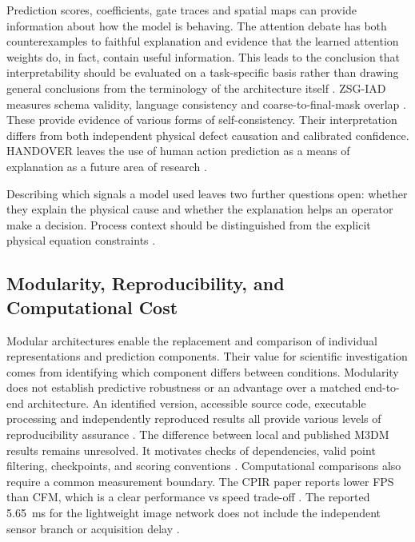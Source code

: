 Prediction scores, coefficients, gate traces and spatial maps can provide information about
how the model is behaving.
The attention debate has both counterexamples to faithful explanation and evidence that the learned
attention weights do, in fact, contain useful information. This leads to the conclusion that
interpretability should be evaluated on a task-specific basis rather than drawing general
conclusions from the terminology of the architecture itself \parencite{P036}.
ZSG-IAD measures schema validity, language consistency and coarse-to-final-mask overlap
\parencite{P025}. These provide evidence of various forms of self-consistency.
Their interpretation differs from both independent physical defect causation and calibrated
confidence.
HANDOVER leaves the use of human action prediction as a means of explanation as a future area of
research \parencite{Thoduka2024Handover}.

Describing which signals a model used leaves two further questions open: whether they explain the physical cause and whether the explanation helps an operator make a decision.
Process context should be distinguished from the explicit physical equation constraints \parencite[e.g.,
PGMTKD's pressure model;][]{Li2025PGMTKD}.

\subsection{Modularity, Reproducibility, and Computational Cost}

Modular architectures enable the replacement and comparison of individual representations
and prediction components. Their value for scientific investigation comes from identifying which component differs between conditions.
Modularity does not establish predictive robustness or an advantage over a matched end-to-end
architecture.
An identified version, accessible source code, executable processing and independently reproduced
results all provide various levels of reproducibility assurance \parencite{P009}.
The difference between local and published M3DM results remains unresolved. It motivates checks of
dependencies, valid point filtering, checkpoints, and scoring conventions \parencite{P033}.
Computational comparisons also require a common measurement boundary. The CPIR paper
reports lower FPS than CFM, which is a clear performance vs speed trade-off
\parencite{Shangguan2025CPIR}.
The reported 5.65~ms for the lightweight image network does not include the independent sensor branch
or acquisition delay \parencite[Table~V]{P035}.

